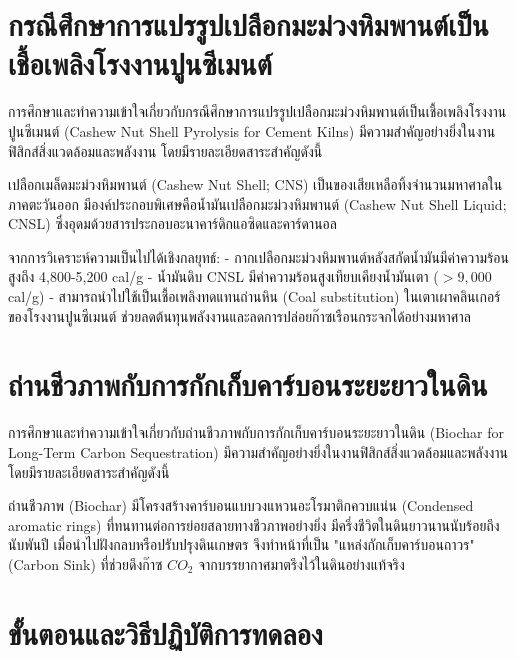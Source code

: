 \section{กรณีศึกษาการแปรรูปเปลือกมะม่วงหิมพานต์เป็นเชื้อเพลิงโรงงานปูนซีเมนต์}

การศึกษาและทำความเข้าใจเกี่ยวกับกรณีศึกษาการแปรรูปเปลือกมะม่วงหิมพานต์เป็นเชื้อเพลิงโรงงานปูนซีเมนต์ (Cashew Nut Shell Pyrolysis for Cement Kilns) มีความสำคัญอย่างยิ่งในงานฟิสิกส์สิ่งแวดล้อมและพลังงาน โดยมีรายละเอียดสาระสำคัญดังนี้

เปลือกเมล็ดมะม่วงหิมพานต์ (Cashew Nut Shell; CNS) เป็นของเสียเหลือทิ้งจำนวนมหาศาลในภาคตะวันออก มีองค์ประกอบพิเศษคือน้ำมันเปลือกมะม่วงหิมพานต์ (Cashew Nut Shell Liquid; CNSL) ซึ่งอุดมด้วยสารประกอบอะนาคาร์ดิกแอซิดและคาร์ดานอล

จากการวิเคราะห์ความเป็นไปได้เชิงกลยุทธ์:
- กากเปลือกมะม่วงหิมพานต์หลังสกัดน้ำมันมีค่าความร้อนสูงถึง 4,800-5,200 cal/g
- น้ำมันดิบ CNSL มีค่าความร้อนสูงเทียบเคียงน้ำมันเตา ($>9,000$ cal/g)
- สามารถนำไปใช้เป็นเชื้อเพลิงทดแทนถ่านหิน (Coal substitution) ในเตาเผาคลินเกอร์ของโรงงานปูนซีเมนต์ ช่วยลดต้นทุนพลังงานและลดการปล่อยก๊าซเรือนกระจกได้อย่างมหาศาล

\section{ถ่านชีวภาพกับการกักเก็บคาร์บอนระยะยาวในดิน}

การศึกษาและทำความเข้าใจเกี่ยวกับถ่านชีวภาพกับการกักเก็บคาร์บอนระยะยาวในดิน (Biochar for Long-Term Carbon Sequestration) มีความสำคัญอย่างยิ่งในงานฟิสิกส์สิ่งแวดล้อมและพลังงาน โดยมีรายละเอียดสาระสำคัญดังนี้

ถ่านชีวภาพ (Biochar) มีโครงสร้างคาร์บอนแบบวงแหวนอะโรมาติกควบแน่น (Condensed aromatic rings) ที่ทนทานต่อการย่อยสลายทางชีวภาพอย่างยิ่ง มีครึ่งชีวิตในดินยาวนานนับร้อยถึงนับพันปี เมื่อนำไปฝังกลบหรือปรับปรุงดินเกษตร จึงทำหน้าที่เป็น "แหล่งกักเก็บคาร์บอนถาวร" (Carbon Sink) ที่ช่วยดึงก๊าซ $CO_2$ จากบรรยากาศมาตรึงไว้ในดินอย่างแท้จริง

\section{ขั้นตอนและวิธีปฏิบัติการทดลอง}


